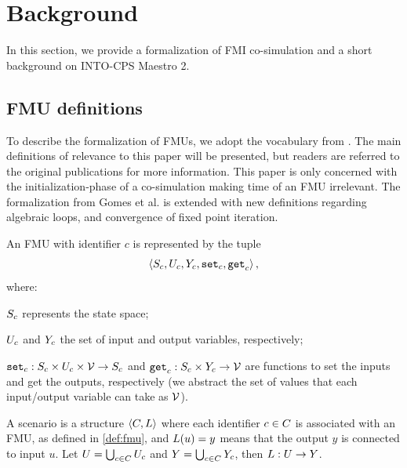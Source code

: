 
\section{Background}\label{sc:background}
In this section, we provide a formalization of FMI co-simulation and a short background on INTO-CPS Maestro 2.

\subsection{FMU definitions}
To describe the formalization of FMUs, we adopt the vocabulary from \cite{gomes_lucio_vangheluwe_2019,Gomes2018}. The main definitions of relevance to this paper will be presented, but readers are referred to the original publications for more information. This paper is only concerned with the initialization-phase of a co-simulation making time of an FMU irrelevant. The formalization from Gomes et al. is extended with new definitions regarding algebraic loops, and convergence of fixed point iteration.
\begin{definition}[FMU]\label{def:fmu}
  An FMU with identifier $c$ is represented by the tuple   
  $$ \left\langle S_{c}, U_{c}, Y_{c}, \mathtt{set}_{c}, \mathtt{get}_{c} \right\rangle ,$$
  where:
  \begin{inparadesc}
    \item $S_{c}$ represents the state space;
    \item $U_{c}$ and $Y_{c}$ the set of input and output variables, respectively;
    \item $\mathtt{set}_{c} : S_{c} \times U_{c} \times \mathcal{V} \to S_{c}$ and $\mathtt{get}_{c}: S_{c} \times Y_{c} \to \mathcal{V}$ are functions to set the inputs and get the outputs, respectively (we abstract the set of values that each input/output variable can take as $\mathcal{V}$).
  \end{inparadesc}
\end{definition}

\begin{definition}[Scenario]\label{def:cosim_scenario}
  A scenario is a structure $ \left\langle C, L \right\rangle $ where each identifier $c \in C$ is associated with an FMU, as defined in \cref{def:fmu}, and $L(u)=y$ means that the output $y$ is connected to input $u$.
  Let $U = \bigcup_{c \in C} U_{c}$ and $Y = \bigcup_{c \in C} Y_{c}$, then $L : U \to Y$.
\end{definition}

